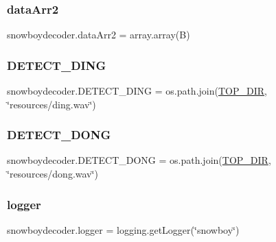 \subsubsection{\texorpdfstring{data\+Arr2}{dataArr2}}
{\footnotesize\ttfamily snowboydecoder.\+data\+Arr2 = array.\+array(\textquotesingle{}B\textquotesingle{})}

\mbox{\label{namespacesnowboydecoder_ae78f17cd44cb19906efdf4e4b57f1553}} 
\subsubsection{\texorpdfstring{D\+E\+T\+E\+C\+T\+\_\+\+D\+I\+NG}{DETECT\_DING}}
{\footnotesize\ttfamily snowboydecoder.\+D\+E\+T\+E\+C\+T\+\_\+\+D\+I\+NG = os.\+path.\+join(\hyperlink{namespacesnowboydecoder_a1e552ae6ff3e3ebc614f0a9256394cce}{T\+O\+P\+\_\+\+D\+IR}, \char`\"{}resources/ding.\+wav\char`\"{})}

\mbox{\label{namespacesnowboydecoder_a4c632caea64a9aaa6e1433c4253f7753}} 
\subsubsection{\texorpdfstring{D\+E\+T\+E\+C\+T\+\_\+\+D\+O\+NG}{DETECT\_DONG}}
{\footnotesize\ttfamily snowboydecoder.\+D\+E\+T\+E\+C\+T\+\_\+\+D\+O\+NG = os.\+path.\+join(\hyperlink{namespacesnowboydecoder_a1e552ae6ff3e3ebc614f0a9256394cce}{T\+O\+P\+\_\+\+D\+IR}, \char`\"{}resources/dong.\+wav\char`\"{})}

\mbox{\label{namespacesnowboydecoder_a0a9e17da91fa38e4980d70341f1af701}} 
\subsubsection{\texorpdfstring{logger}{logger}}
{\footnotesize\ttfamily snowboydecoder.\+logger = logging.\+get\+Logger(\char`\"{}snowboy\char`\"{})}

